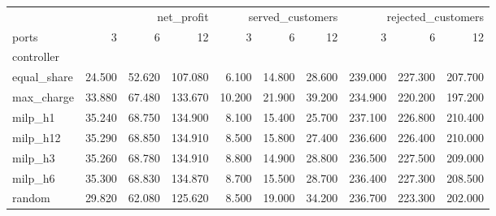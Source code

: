 \begin{tabular}{lrrrrrrrrr}
\toprule
 & \multicolumn{3}{r}{net_profit} & \multicolumn{3}{r}{served_customers} & \multicolumn{3}{r}{rejected_customers} \\
ports & 3 & 6 & 12 & 3 & 6 & 12 & 3 & 6 & 12 \\
controller &  &  &  &  &  &  &  &  &  \\
\midrule
equal_share & 24.500 & 52.620 & 107.080 & 6.100 & 14.800 & 28.600 & 239.000 & 227.300 & 207.700 \\
max_charge & 33.880 & 67.480 & 133.670 & 10.200 & 21.900 & 39.200 & 234.900 & 220.200 & 197.200 \\
milp_h1 & 35.240 & 68.750 & 134.900 & 8.100 & 15.400 & 25.700 & 237.100 & 226.800 & 210.400 \\
milp_h12 & 35.290 & 68.850 & 134.910 & 8.500 & 15.800 & 27.400 & 236.600 & 226.400 & 210.000 \\
milp_h3 & 35.260 & 68.780 & 134.910 & 8.800 & 14.900 & 28.800 & 236.500 & 227.500 & 209.000 \\
milp_h6 & 35.300 & 68.830 & 134.870 & 8.700 & 15.500 & 28.700 & 236.400 & 227.300 & 208.500 \\
random & 29.820 & 62.080 & 125.620 & 8.500 & 19.000 & 34.200 & 236.700 & 223.300 & 202.000 \\
\bottomrule
\end{tabular}
